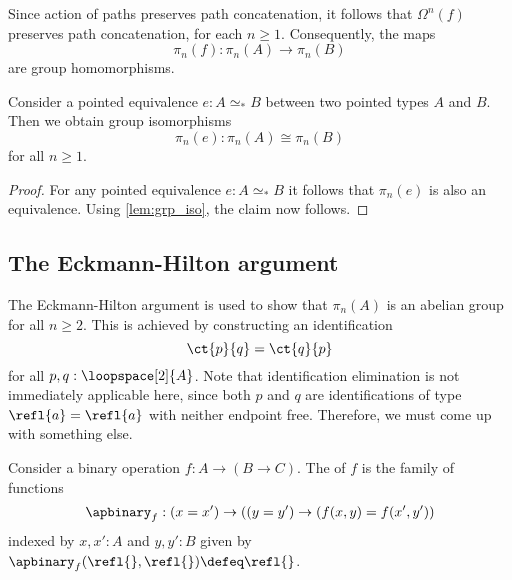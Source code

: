 \begin{rmk}
  Since action of paths preserves path concatenation, it follows that $\Omega^n(f)$ preserves path concatenation, for each $n\geq 1$. Consequently, the maps
  \begin{equation*}
    \pi_n(f):\pi_n(A)\to\pi_n(B)
  \end{equation*}
  are group homomorphisms.
\end{rmk}

\begin{prp}
  Consider a pointed equivalence $e:A\simeq_\ast B$ between two pointed types $A$ and $B$. Then we obtain group isomorphisms
  \begin{equation*}
    \pi_n(e):\pi_n(A)\cong\pi_n(B)
  \end{equation*}
  for all $n\geq 1$.
\end{prp}

\begin{proof}
  For any pointed equivalence $e:A\simeq_\ast B$ it follows that $\pi_n(e)$ is also an equivalence. Using \cref{lem:grp_iso}, the claim now follows.
\end{proof}

\subsection{The Eckmann-Hilton argument}

The Eckmann-Hilton argument is used to show that $\pi_n(A)$ is an abelian group for all $n\geq 2$. This is achieved by constructing an identification
\begin{equation*}
  \ct{p}{q}=\ct{q}{p}
\end{equation*}
for all $p,q:\loopspace[2]{A}$. Note that identification elimination is not immediately applicable here, since both $p$ and $q$ are identifications of type $\refl{a}=\refl{a}$ with neither endpoint free. Therefore, we must come up with something else.

\begin{defn}
  Consider a binary operation $f:A\to(B\to C)$. The  of $f$ is the family of functions
  \begin{equation*}
    \apbinary_f:(x=x')\to ((y=y') \to (f(x,y)=f(x',y'))
  \end{equation*}
  indexed by $x,x':A$ and $y,y':B$ given by $\apbinary_f(\refl{},\refl{})\defeq\refl{}$.
\end{defn}

